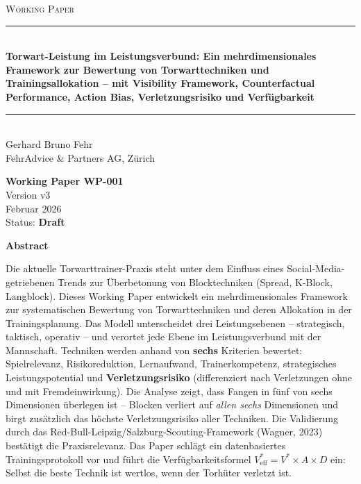 \documentclass[12pt,a4paper]{article}
\newcommand{\WPNumber}{WP-001}
\newcommand{\WPVersion}{v3}
\newcommand{\WPDate}{Februar 2026}
\newcommand{\WPTitle}{Torwart-Leistung im Leistungsverbund: Ein mehrdimensionales Framework zur Bewertung von Torwarttechniken und Trainingsallokation -- mit Visibility Framework, Counterfactual Performance, Action Bias, Verletzungsrisiko und Verf\"ugbarkeit}
\newcommand{\WPAuthors}{Gerhard Bruno Fehr}
\newcommand{\WPStatus}{Draft}
\begin{document}

\begin{titlepage}
\begin{center}

\vspace*{1cm}

{\small\textsc{Working Paper}}\\[1.5cm]

\rule{\linewidth}{0.5pt}\\[0.4cm]
{\LARGE\bfseries \WPTitle}\\[0.4cm]
\rule{\linewidth}{0.5pt}\\[2cm]

{\Large \WPAuthors}\\[0.3cm]
{\large FehrAdvice \& Partners AG, Z\"urich}\\[2.5cm]

\begin{tcolorbox}[colback=fadarkblue!5!white, colframe=fadarkblue, width=8cm]
\centering
\textbf{Working Paper \WPNumber}\\
Version \WPVersion\\
\WPDate\\[0.5em]
Status: \textbf{\WPStatus}
\end{tcolorbox}

\vfill

{\small
\textbf{Abstract}\\[0.5em]
\begin{minipage}{0.85\textwidth}
Die aktuelle Torwarttrainer-Praxis steht unter dem Einfluss eines Social-Media-getriebenen Trends zur \"Uberbetonung von Blocktechniken (Spread, K-Block, Langblock). Dieses Working Paper entwickelt ein mehrdimensionales Framework zur systematischen Bewertung von Torwarttechniken und deren Allokation in der Trainingsplanung. Das Modell unterscheidet drei Leistungsebenen -- strategisch, taktisch, operativ -- und verortet jede Ebene im Leistungsverbund mit der Mannschaft. Techniken werden anhand von \textbf{sechs} Kriterien bewertet: Spielrelevanz, Risikoreduktion, Lernaufwand, Trainerkompetenz, strategisches Leistungspotential und \textbf{Verletzungsrisiko} (differenziert nach Verletzungen ohne und mit Fremdeinwirkung). Die Analyse zeigt, dass Fangen in f\"unf von sechs Dimensionen \"uberlegen ist -- Blocken verliert auf \emph{allen sechs} Dimensionen und birgt zus\"atzlich das h\"ochste Verletzungsrisiko aller Techniken. Die Validierung durch das Red-Bull-Leipzig/Salzburg-Scouting-Framework (Wagner, 2023) best\"atigt die Praxisrelevanz. Das Paper schl\"agt ein datenbasiertes Trainingsprotokoll vor und f\"uhrt die Verf\"ugbarkeitsformel $V^{*}_{\text{eff}} = V^{*} \times A \times D$ ein: Selbst die beste Technik ist wertlos, wenn der Torh\"uter verletzt ist.
\end{minipage}
}


\end{center}
\end{titlepage}
\end{document}
